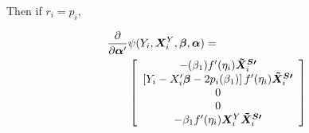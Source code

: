 \documentclass{statsoc} %
\begin{document}
Then if $r_i=p_i$,

\begin{align*}
  \frac{\partial}{\partial \bm{\alpha}'}&\psi(Y_i,\bm{X}^Y_i,\bm{\beta},\bm{\alpha})=\\
  & \left[\begin{array}{c}
          -(\beta_1)f'(\eta_i)\bm{\tilde{X}^{S\prime}}_i\\
          \left[Y_i-X_i'\bm{\beta}-2p_i(\beta_1)\right]f'(\eta_i)\bm{\tilde{X}^{S\prime}}_i\\
          0\\
          0\\
          -\beta_1f'(\eta_i)\bm{X}^Y_i\bm{\tilde{X}^{S\prime}}_i
    \end{array}\right]
\end{align*}
\end{document}
